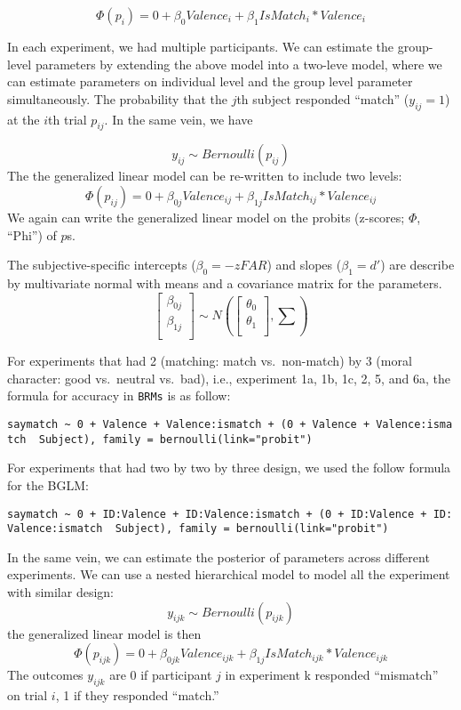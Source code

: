 \documentclass[
  english,
  man]{apa6}
\begin{document}
\[ \Phi(p_{i}) = 0 + \beta_{0}Valence_{i} + \beta_{1}IsMatch_{i}  * Valence_{i} \]

In each experiment, we had multiple participants. We can estimate the group-level parameters by extending the above model into a two-leve model, where we can estimate parameters on individual level and the group level parameter simultaneously. The probability that the \(j\)th subject responded ``match'' (\(y_{ij} = 1\)) at the \(i\)th trial \(p_{ij}\). In the same vein, we have

\[ y_{ij} \sim Bernoulli(p_{ij})\]
The the generalized linear model can be re-written to include two levels:
\[ \Phi(p_{ij}) = 0 + \beta_{0j}Valence_{ij} + \beta_{1j}IsMatch_{ij} * Valence_{ij}\]
We again can write the generalized linear model on the probits (z-scores; \(\Phi\), ``Phi'') of \(p\)s.

The subjective-specific intercepts (\(\beta_{0} = -zFAR\)) and slopes (\(\beta_{1} = d'\)) are describe by multivariate normal with means and a covariance matrix for the parameters.
\[ \begin{bmatrix}\beta_{0j}\\
\beta_{1j}\\
\end{bmatrix} \sim N(\begin{bmatrix}\theta_{0}\\
\theta_{1}\\
\end{bmatrix}, \sum) \]

For experiments that had 2 (matching: match vs.~non-match) by 3 (moral character: good vs.~neutral vs.~bad), i.e., experiment 1a, 1b, 1c, 2, 5, and 6a, the formula for accuracy in \texttt{BRMs} is as follow:

\texttt{saymatch\ \textasciitilde{}\ 0\ +\ Valence\ +\ Valence:ismatch\ +\ (0\ +\ Valence\ +\ Valence:ismatch\ \textbar{}\ Subject),\ family\ =\ bernoulli(link="probit")}

For experiments that had two by two by three design, we used the follow formula for the BGLM:

\texttt{saymatch\ \textasciitilde{}\ 0\ +\ ID:Valence\ +\ ID:Valence:ismatch\ +\ (0\ +\ ID:Valence\ +\ ID:Valence:ismatch\ \textbar{}\ Subject),\ family\ =\ bernoulli(link="probit")}

In the same vein, we can estimate the posterior of parameters across different experiments. We can use a nested hierarchical model to model all the experiment with similar design:
\[y_{ijk} \sim Bernoulli(p_{ijk})\]
the generalized linear model is then
\[ \Phi(p_{ijk}) =  0 + \beta_{0jk}Valence_{ijk} + \beta_{1j}IsMatch_{ijk} * Valence_{ijk}\]
The outcomes \(y_{ijk}\) are 0 if participant \(j\) in experiment k responded ``mismatch'' on trial \(i\), 1 if they responded ``match.''
\end{document}
